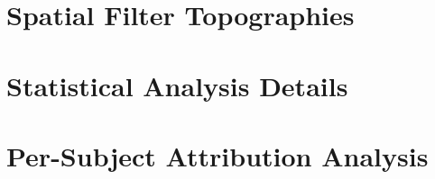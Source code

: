 \section{Spatial Filter Topographies}
\label{app:spatial_filters}

%
%


\section{Statistical Analysis Details}
\label{app:statistics}

%
% 
%


\section{Per-Subject Attribution Analysis}
\label{app:subject_attributions}

%
%
